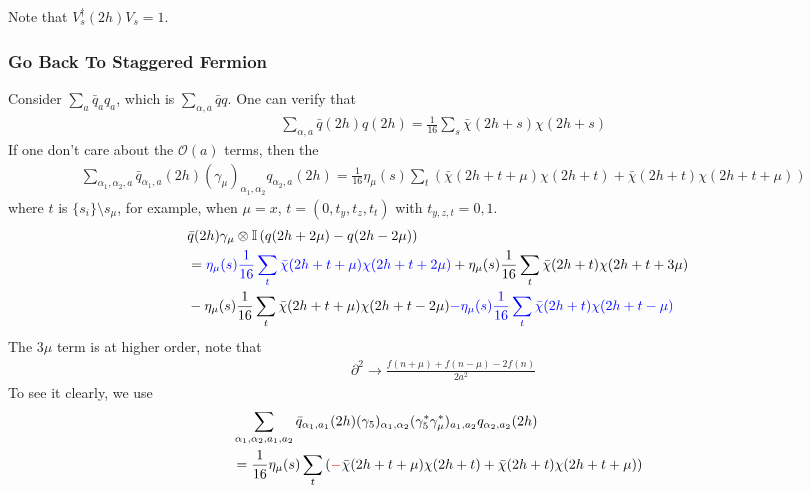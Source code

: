 Note that $V_s^{\dagger}(2h)V_s=1$.

\subsubsection{\label{QuarkGoBackToStaggered}Go Back To Staggered Fermion}

Consider $\sum _a \bar{q}_aq_a$, which is $\sum _{\alpha,a} \bar{q}q$. One can verify that
\begin{equation}
\begin{split}
&\sum _{\alpha,a} \bar{q}(2h)q(2h) = \frac{1}{16}\sum _s \bar{\chi}(2h+s)\chi (2h+s)
\end{split}
\end{equation}
If one don't care about the $\mathcal{O}(a)$ terms, then the 
\textcolor[rgb]{0,0.5,0}{
\begin{equation}
\begin{split}
&\sum _{\alpha_1,\alpha _2,a} \bar{q}_{\alpha_1,a}(2h)(\gamma _{\mu})_{\alpha_1,\alpha_2} q_{\alpha _2,a}(2h) = \frac{1}{16} \eta _{\mu}(s)\sum _{t} \left(\bar{\chi}(2h+t+\mu)\chi (2h+t) +  \bar{\chi}(2h+t)\chi (2h+t+\mu)\right)
\end{split}
\end{equation}}
where $t$ is $\{s_{i}\}\setminus s_{\mu}$, for example, when $\mu=x$, $t=(0,t_y,t_z,t_t)$ with $t_{y,z,t}=0,1$.
\begin{equation}
\begin{split}
&\bar{q}(2h)\gamma _{\mu}\otimes \mathbb{I} \left(q(2h+2\mu)-q(2h-2\mu)\right) \\
&=\textcolor[rgb]{0,0,1}{\eta _{\mu}(s)\frac{1}{16}\sum _{t} \bar{\chi}(2h+t+\mu)\chi (2h+t+2\mu)} + \eta _{\mu}(s)\frac{1}{16}\sum _{t} \bar{\chi}(2h+t)\chi (2h+t+3\mu)\\
&-\eta _{\mu}(s)\frac{1}{16}\sum _{t} \bar{\chi}(2h+t+\mu)\chi (2h+t-2\mu) \textcolor[rgb]{0,0,1}{- \eta_{\mu} (s)\frac{1}{16}\sum _{t} \bar{\chi}(2h+t)\chi (2h+t-\mu)}
\end{split}
\end{equation}
The $3\mu$ term is at higher order, note that
\begin{equation}
\begin{split}
&\partial ^2 \to \frac{f(n+\mu)+f(n-\mu)-2f(n)}{2a^2}
\end{split}
\end{equation}
To see it clearly, we use
\begin{equation}
\begin{split}
&\sum _{\alpha_1,\alpha _2,a_1,a_2} \bar{q}_{\alpha_1,a_1}(2h)(\gamma _5)_{\alpha_1,\alpha_2} (\gamma _5^*\gamma _{\mu}^*)_{a_1,a_2}q_{\alpha _2,a_2}(2h) \\
&= \frac{1}{16} \eta _{\mu}(s)\sum _{t} \left(\textcolor[rgb]{1,0,0}{-}\bar{\chi}(2h+t+\mu)\chi (2h+t) +  \bar{\chi}(2h+t)\chi (2h+t+\mu)\right)
\end{split}
\label{eq.staggeredquark1}
\end{equation}
